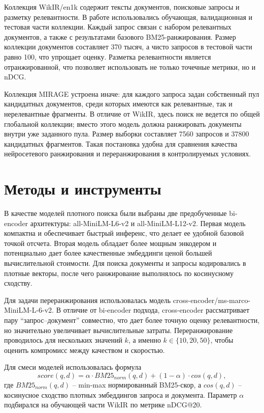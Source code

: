 \documentclass[11pt]{article}
\begin{document}
Коллекция WikIR/en1k содержит тексты документов, поисковые запросы и разметку
релевантности. В работе использовались обучающая, валидационная и тестовая части
коллекции. Каждый запрос связан с набором релевантных документов, а также с
результатами базового BM25-ранжирования. Размер коллекции документов составляет
370 тысяч, а чисто запросов в тестовой части равно 100, что упрощает оценку.
Разметка релевантности является отранжированной, что позволяет использовать не
только точечные метрики, но и nDCG.

Коллекция MIRAGE устроена иначе: для каждого запроса задан собственный пул
кандидатных документов, среди которых имеются как релевантные, так и нерелевантные
фрагменты. В отличие от WikIR, здесь поиск не ведется по общей глобальной
коллекции; вместо этого модель должна ранжировать документы внутри уже заданного
пула. Размер выборки составляет 7560 запросов и 37800 кандидатных фрагментов.
Такая постановка удобна для сравнения качества нейросетевого ранжирования и
переранжирования в контролируемых условиях.

\section{Методы и инструменты}

В качестве моделей плотного поиска были выбраны две предобученные bi-encoder
архитектуры: all-MiniLM-L6-v2 и all-MiniLM-L12-v2. Первая модель компактна и
обеспечивает быстрый инференс, что делает ее удобной базовой точкой отсчета. Вторая
модель обладает более мощным энкодером и потенциально дает более качественные
эмбеддинги ценой большей вычислительной стоимости. Для поиска документы и запросы
кодировались в плотные векторы, после чего ранжирование выполнялось по косинусному сходству.

Для задачи переранжирования использовалась модель cross-encoder/ms-marco-MiniLM-L-6-v2.
В отличие от bi-encoder подхода, cross-encoder рассматривает пару ``запрос--документ''
совместно, что дает более точную оценку релевантности, но значительно
увеличивает вычислительные затраты. Переранжирование проводилось для нескольких
значений $k$, а именно $k \in \{10, 20, 50\}$, чтобы оценить компромисс между
качеством и скоростью.

Для смеси моделей использовалась формула
\[
score(q, d) = \alpha \cdot BM25_{norm}(q, d) + (1 - \alpha) \cdot cos(q, d),
\]
где $BM25_{norm}(q, d)$ -- min-max нормированный BM25-скор, а $cos(q, d)$ --
косинусное сходство плотных эмбеддингов запроса и документа. Параметр $\alpha$
подбирался на обучающей части WikIR по метрике nDCG@20.
\end{document}
